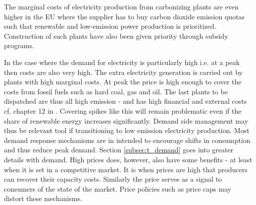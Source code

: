\noindent The marginal costs of electricity production from carbonizing plants are even higher in the EU where the supplier has to buy carbon dioxide emission quotas such that renewable and low-emission power production is prioritized. Construction of such plants have also been given priority through subsidy programs. 
\medskip

In the case where the demand for electricity is particularly high i.e. at a peak then costs are also very high. The extra electricity generation is carried out by plants with high marginal costs. At peak the price is high enough to cover the costs from fossil fuels such as hard coal, gas and oil. The last plants to be dispatched are thus all high emission - and has high financial and external costs cf. chapter 12 in \citet{zweifel2017energy}. Covering spikes like this will remain problematic even if the share of renewable energy increases significantly. Demand side management may thus be relevant tool if transitioning to low emission electricity production. Most demand response mechanisms are in intended to encourage shifts in consumption and thus reduce peak demand. Section \ref{subsec:t_demand} goes into greater details with demand. High prices does, however, also have some benefits - at least when it is set in a competitive market. It is when prices are high that producers can recover their capacity costs. Similarly the price serves as a signal to consumers of the state of the market. Price policies such as price caps may distort these mechanisms. 



